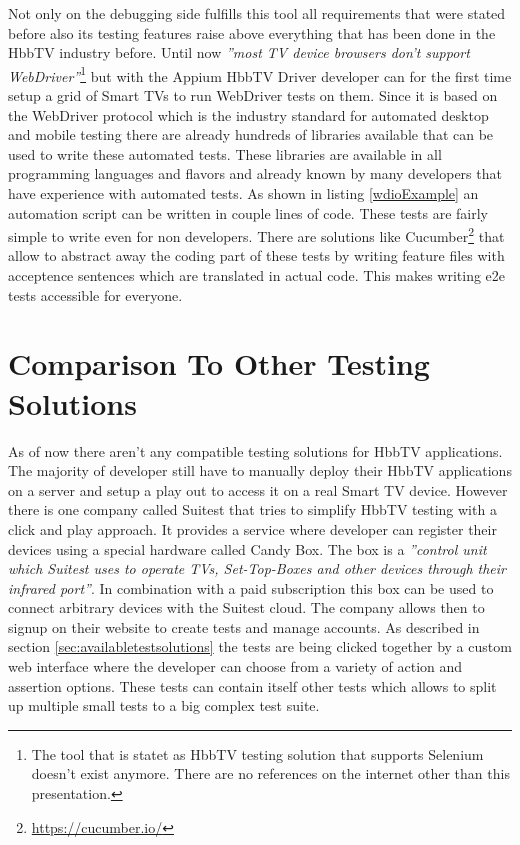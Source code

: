 Not only on the debugging side fulfills this tool all requirements that were stated before also its testing
features raise above everything that has been done in the HbbTV industry before. Until now \textit{''most TV
device browsers don’t support WebDriver''}\cite{sengo}\footnote{The tool that is statet as HbbTV testing solution
that supports Selenium doesn't exist anymore. There are no references on the internet other than this presentation.}
but with the Appium HbbTV Driver developer can for the first time setup a grid of Smart TVs to run WebDriver
tests on them. Since it is based on the WebDriver protocol which is the industry standard for automated desktop
and mobile testing there are already hundreds of libraries available that can be used to write these automated tests.
These libraries are available in all programming languages and flavors and already known by many developers that
have experience with automated tests. As shown in listing \ref{wdioExample} an automation script can be written
in couple lines of code. These tests are fairly simple to write even for non developers. There are solutions like
Cucumber\footnote{\url{https://cucumber.io/}} that allow to abstract away the coding part of these tests by writing
feature files with acceptence sentences which are translated in actual code. This makes writing e2e tests accessible
for everyone.

\section{Comparison To Other Testing Solutions\label{sec:businessmodel}}

As of now there aren't any compatible testing solutions for HbbTV applications. The majority of developer still have
to manually deploy their HbbTV applications on a server and setup a play out to access it on a real Smart TV device.
However there is one company called Suitest that tries to simplify HbbTV testing with a click and play approach.
It provides a service where developer can register their devices using a special hardware called Candy Box. The box
is a \textit{''control unit which Suitest uses to operate TVs, Set-Top-Boxes and other devices through their infrared
port''}\cite{candybox}. In combination with a paid subscription this box can be used to connect arbitrary devices
with the Suitest cloud. The company allows then to signup on their website to create tests and manage accounts.
As described in section \ref{sec:availabletestsolutions} the tests are being clicked together by a custom web interface
where the developer can choose from a variety of action and assertion options. These tests can contain itself other
tests which allows to split up multiple small tests to a big complex test suite.

